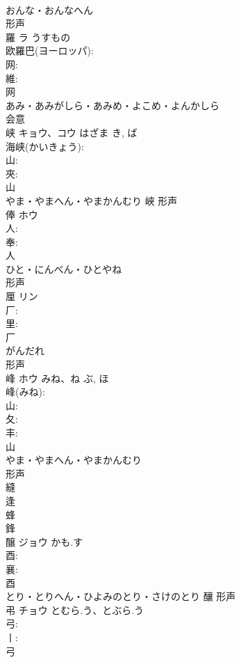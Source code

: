 \documentclass[8pt]{extreport}
\begin{document}
\begin{CJK}{UTF8}{min}
\\	おんな・おんなへん	
\\	形声 
\\	羅	ラ	うすもの		
\\	欧羅巴(ヨーロッパ): 
\\	网: 
\\	維: 
\\	网	
\\	あみ・あみがしら・あみめ・よこめ・よんかしら	
\\	会意 
\\	峡	キョウ、コウ	はざま	き, ば	
\\	海峡(かいきょう): 
\\	山: 
\\	夾: 
\\	山	
\\	やま・やまへん・やまかんむり	峽	形声 
\\	俸	ホウ			
\\	人: 
\\	奉: 
\\	人	
\\	ひと・にんべん・ひとやね	
\\	形声 
\\	厘	リン			
\\	厂: 
\\	里: 
\\	厂	
\\	がんだれ	
\\	形声 
\\	峰	ホウ	みね、ね	ぶ, ほ	
\\	峰(みね): 
\\	山: 
\\	夂: 
\\	丰: 
\\	山	
\\	やま・やまへん・やまかんむり	
\\	形声 
\\	縫 
\\	逢 
\\	蜂 
\\	鋒 
\\	醸	ジョウ	かも.す		
\\	酉: 
\\	襄: 
\\	酉	
\\	とり・とりへん・ひよみのとり・さけのとり	釀	形声 
\\	弔	チョウ	とむら.う、とぶら.う		
\\	弓: 
\\	丨: 
\\	弓	

\end{CJK}
\end{document}

